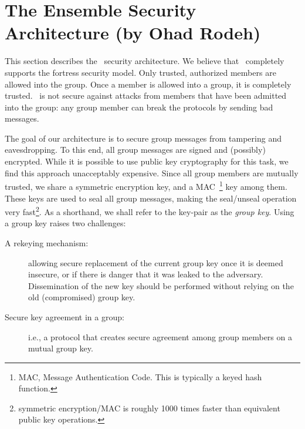 %
%
%
\section{The Ensemble Security Architecture (by Ohad Rodeh)}
\long{}

This section describes the \ensemble\ security architecture. We
believe that \ensemble\ completely supports the fortress security
model. Only trusted, authorized members are allowed into the group.
Once a member is allowed into a group, it is completely trusted.
\ensemble\ is not secure against attacks from members that have been
admitted into the group: any group member can break the protocols by
sending bad messages.

The goal of our architecture is to secure group messages from
tampering and eavesdropping. To this end, all group messages are
signed and (possibly) encrypted. While it is possible to use public
key cryptography for this task, we find this approach unacceptably
expensive. Since all group members are mutually trusted, we share a
symmetric encryption key, and a MAC~\footnote{MAC, Message Authentication
Code. This is typically a keyed hash function.} key among them. These
keys are used to seal all group messages, making the seal/unseal
operation very fast\footnote{symmetric encryption/MAC is roughly 1000
times faster than equivalent public key operations.}. As a shorthand,
we shall refer to the key-pair as the {\it group key}. Using a group key
raises two challenges:

\begin{description}
\item[ A rekeying mechanism:] allowing secure replacement of the current
group key once it is deemed insecure, or if there is danger that it
was leaked to the adversary. Dissemination of the new key should be
performed without relying on the old (compromised) group key.

\item[Secure key agreement in a group:] i.e., a protocol that creates
secure agreement among group members on a mutual group key. 
\end{description}

